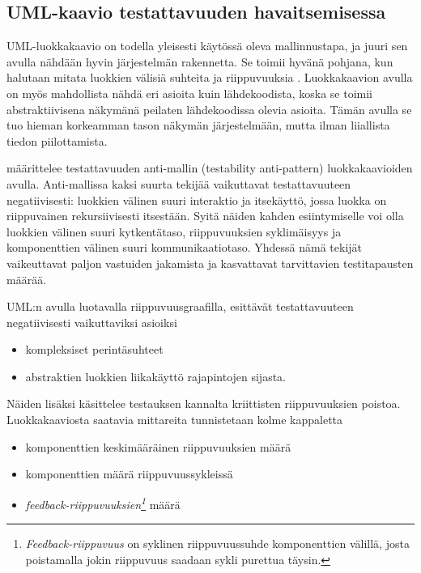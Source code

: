 \documentclass[finnish]{tktltiki2}
\theoremstyle{definition}
\theoremstyle{remark}
\begin{document}
\subsection{UML-kaavio testattavuuden havaitsemisessa}

UML-luokkakaavio on todella yleisesti käytössä oleva mallinnustapa, ja juuri sen avulla nähdään hyvin järjestelmän rakennetta. Se toimii hyvänä pohjana, kun halutaan mitata luokkien välisiä suhteita ja riippuvuuksia \citep{baudry_testability_2002}. Luokkakaavion avulla on myös mahdollista nähdä eri asioita kuin lähdekoodista, koska se toimii abstraktiivisena näkymänä peilaten lähdekoodissa olevia asioita. Tämän avulla se tuo hieman korkeamman tason näkymän järjestelmään, mutta ilman liiallista tiedon piilottamista. 

\citep[s. 3]{baudry_measuring_2003} määrittelee testattavuuden anti-mallin (testability anti-pattern) luokkakaavioiden avulla. Anti-mallissa kaksi suurta tekijää vaikuttavat testattavuuteen negatiivisesti: luokkien välinen suuri interaktio ja itsekäyttö, jossa luokka on riippuvainen rekursiivisesti itsestään. Syitä näiden kahden esiintymiselle voi olla luokkien välinen suuri kytkentätaso, riippuvuuksien syklimäisyys ja komponenttien välinen suuri kommunikaatiotaso. Yhdessä nämä tekijät vaikeuttavat paljon vastuiden jakamista ja kasvattavat tarvittavien testitapausten määrää. 


UML:n avulla luotavalla riippuvuusgraafilla, esittävät testattavuuteen negatiivisesti vaikuttaviksi asioiksi \citep{baudry_testability_2002}

\begin{itemize} 
	\item kompleksiset perintäsuhteet
	\item abstraktien luokkien liikakäyttö rajapintojen sijasta.
\end{itemize}


Näiden lisäksi \citep{Jungmayr:2002} käsittelee testauksen kannalta kriittisten riippuvuuksien poistoa. Luokkakaaviosta saatavia mittareita tunnistetaan kolme kappaletta 

\begin{itemize}
	\item komponenttien keskimääräinen riippuvuuksien määrä
	\item komponenttien määrä riippuvuussykleissä
	\item \textit{feedback-riippuvuuksien\footnote{\textit{Feedback-riippuvuus} on syklinen riippuvuussuhde komponenttien välillä, josta poistamalla jokin riippuvuus saadaan sykli purettua täysin.}}  määrä 
\end{itemize}
\end{document}
